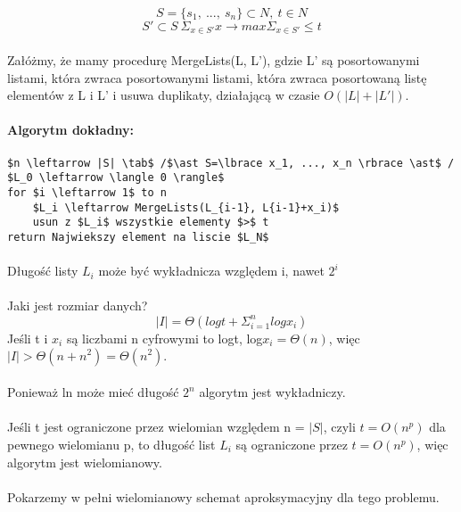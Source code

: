 $$S=\lbrace s_1,\ ...,\ s_n \rbrace \subset N,\ t\in N$$
$$S'\subset S\ \Sigma_{x\in S'}x \rightarrow max\Sigma_{x\in S'}\leq t$$
\paragraph{}{Załóżmy, że mamy procedurę MergeLists(L, L'), gdzie L' są posortowanymi listami, która zwraca posortowanymi listami, która zwraca posortowaną listę elementów z L i L' i usuwa duplikaty, działającą w czasie $O(|L|+|L'|)$.}
\paragraph{Algorytm dokładny:}
\begin{lstlisting}[caption={ExactSubsetSum(S,t)}]
$n \leftarrow |S| \tab$ /$\ast S=\lbrace x_1, ..., x_n \rbrace \ast$ /
$L_0 \leftarrow \langle 0 \rangle$
for $i \leftarrow 1$ to n
	$L_i \leftarrow MergeLists(L_{i-1}, L{i-1}+x_i)$
	usun z $L_i$ wszystkie elementy $>$ t
return Najwiekszy element na liscie $L_N$
\end{lstlisting}
\paragraph{}{Długość listy $L_i$ może być wykładnicza względem i, nawet $2^i$}
\paragraph{}{Jaki jest rozmiar danych? $$|I|=\Theta(log t+ \Sigma^n_{i=1}log x_i)$$ Jeśli t i $x_i$ są liczbami n cyfrowymi to logt, log$x_i=\Theta(n)$, więc $|I|>\Theta(n+n^2)=\Theta(n^2).$}
\paragraph{}{Ponieważ ln może mieć długość $2^n$ algorytm jest wykładniczy.}
\paragraph{}{Jeśli t jest ograniczone przez wielomian względem n = $|S|$, czyli $t=O(n^p)$ dla pewnego wielomianu p, to długość list $L_i$ są ograniczone przez $t=O(n^p)$, więc algorytm jest wielomianowy.}
\paragraph{}{Pokarzemy w pełni wielomianowy schemat aproksymacyjny dla tego problemu.}

